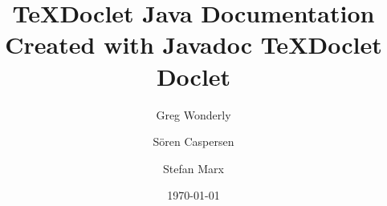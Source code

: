 

\date{\today}
\title{TeXDoclet Java Documentation\bigskip\\ \Large Created with Javadoc TeXDoclet Doclet}
\author{Greg Wonderly \and S\"oren Caspersen \and Stefan Marx}


